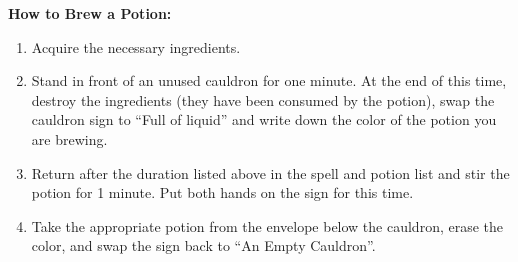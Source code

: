 \documentclass[green]{NeptuneBall}
\begin{document}
{\bf How to Brew a Potion:}\\
\begin{enumerate}
  \item Acquire the necessary ingredients.
  \item Stand in front of an unused cauldron for one minute. At the end of this time, destroy the ingredients (they have been consumed by the potion), swap the cauldron sign to ``Full of liquid'' and write down the color of the potion you are brewing.
  \item Return after the duration listed above in the spell and potion list and stir the potion for 1 minute. Put both hands on the sign for this time.
  \item Take the appropriate potion from the envelope below the cauldron, erase the color, and swap the sign back to ``An Empty Cauldron''.
\end{enumerate}
\end{document}
